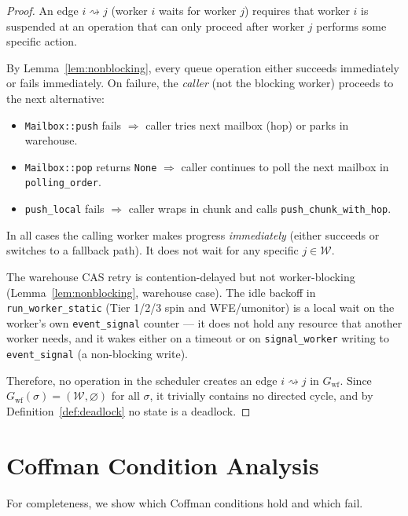 \documentclass[11pt,a4paper]{article}
\newcommand{\code}[1]{\texttt{#1}}
\begin{document}
\begin{proof}
An edge $i \rightsquigarrow j$ (worker $i$ waits for worker $j$)
requires that worker $i$ is suspended at an operation that can only
proceed after worker $j$ performs some specific action.

By Lemma~\ref{lem:nonblocking}, every queue operation either
succeeds immediately or fails immediately.  On failure, the
\emph{caller} (not the blocking worker) proceeds to the next
alternative:
\begin{itemize}
  \item \code{Mailbox::push} fails $\Rightarrow$ caller tries
        next mailbox (hop) or parks in warehouse.
  \item \code{Mailbox::pop} returns \code{None} $\Rightarrow$ caller
        continues to poll the next mailbox in \code{polling\_order}.
  \item \code{push\_local} fails $\Rightarrow$ caller wraps in chunk
        and calls \code{push\_chunk\_with\_hop}.
\end{itemize}
In all cases the calling worker makes progress \emph{immediately}
(either succeeds or switches to a fallback path).  It does not wait
for any specific $j \in \mathcal{W}$.

The warehouse CAS retry is contention-delayed but not
worker-blocking (Lemma~\ref{lem:nonblocking}, warehouse case).
The idle backoff in \code{run\_worker\_static} (Tier 1/2/3 spin
and WFE/umonitor) is a local wait on the worker's own
\code{event\_signal} counter --- it does not hold any resource that
another worker needs, and it wakes either on a timeout or on
\code{signal\_worker} writing to \code{event\_signal} (a
non-blocking write).

Therefore, no operation in the scheduler creates an edge $i
\rightsquigarrow j$ in $G_{\text{wf}}$.  Since
$G_{\text{wf}}(\sigma) = (\mathcal{W}, \varnothing)$ for all
$\sigma$, it trivially contains no directed cycle, and by
Definition~\ref{def:deadlock} no state is a deadlock.
\end{proof}

\section{Coffman Condition Analysis}

For completeness, we show which Coffman conditions hold and which fail.
\end{document}
